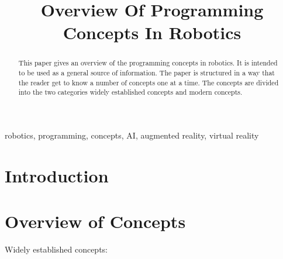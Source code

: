 \documentclass[conference]{IEEEtran}
\begin{document}
\title{Overview Of Programming Concepts In Robotics\\}

\author{

    \and
}

\maketitle

\begin{abstract}
    This paper gives an overview of the programming concepts in robotics. It is intended to be used as a general source of information. The paper is structured in a way that the reader get to know a number of concepts one at a time. The concepts are divided into the two categories widely established concepts and modern concepts.
\end{abstract}

\begin{IEEEkeywords}
    robotics, programming, concepts, AI, augmented reality, virtual reality 
\end{IEEEkeywords}

\section{Introduction}
  
\section{Overview of Concepts}

Widely established concepts:
\end{document}
